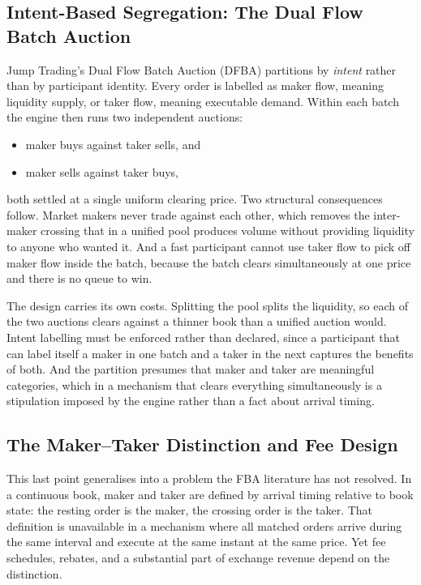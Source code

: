 \subsection{Intent-Based Segregation: The Dual Flow Batch Auction}

Jump Trading's Dual Flow Batch Auction (DFBA) partitions by
\emph{intent} rather than by participant identity. Every order is
labelled as maker flow, meaning liquidity supply, or taker flow, meaning
executable demand. Within each batch the engine then runs two
independent auctions:

\begin{itemize}
  \item maker buys against taker sells, and
  \item maker sells against taker buys,
\end{itemize}

both settled at a single uniform clearing price. Two structural
consequences follow. Market makers never trade against each other,
which removes the inter-maker crossing that in a unified pool produces
volume without providing liquidity to anyone who wanted it. And a fast
participant cannot use taker flow to pick off maker flow inside the
batch, because the batch clears simultaneously at one price and there is
no queue to win.

The design carries its own costs. Splitting the pool splits the
liquidity, so each of the two auctions clears against a thinner book
than a unified auction would. Intent labelling must be enforced rather
than declared, since a participant that can label itself a maker in one
batch and a taker in the next captures the benefits of both. And the
partition presumes that maker and taker are meaningful categories, which
in a mechanism that clears everything simultaneously is a stipulation
imposed by the engine rather than a fact about arrival timing.

\subsection{The Maker--Taker Distinction and Fee Design}

This last point generalises into a problem the FBA literature has not
resolved. In a continuous book, maker and taker are defined by arrival
timing relative to book state: the resting order is the maker, the
crossing order is the taker. That definition is unavailable in a
mechanism where all matched orders arrive during the same interval and
execute at the same instant at the same price. Yet fee schedules,
rebates, and a substantial part of exchange revenue depend on the
distinction.

